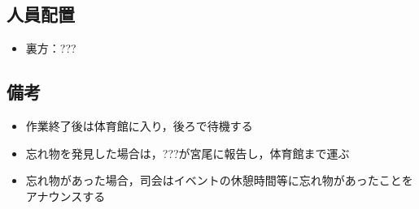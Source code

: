 \subsection{人員配置}
\begin{itemize}
\item 裏方：???
\end{itemize}


\subsection{備考}
\begin{itemize}
  \item 作業終了後は体育館に入り，後ろで待機する
  \item 忘れ物を発見した場合は，???が宮尾に報告し，体育館まで運ぶ
  \item 忘れ物があった場合，司会はイベントの休憩時間等に忘れ物があったことをアナウンスする
\end{itemize}

%


